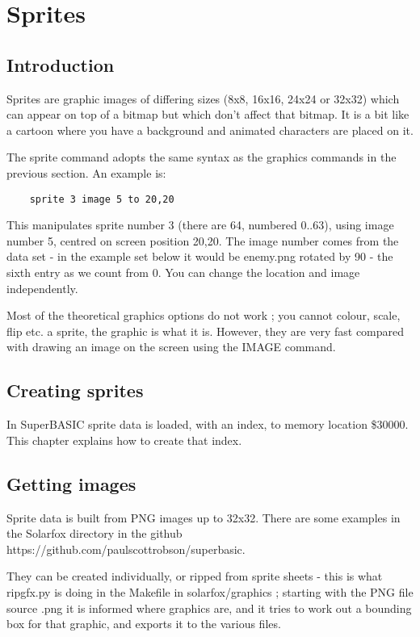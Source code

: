 \chapter{Sprites}

\section{Introduction}

Sprites are graphic images of differing sizes (8x8, 16x16, 24x24 or 32x32) which can appear on top of a bitmap but which don't affect that bitmap. It is a bit like a cartoon where you have a background and animated characters are placed on it.

The sprite command adopts the same syntax as the graphics commands in the previous section. An example is:

\begin{verbatim}
	sprite 3 image 5 to 20,20
\end{verbatim}

This manipulates sprite number 3 (there are 64, numbered 0..63), using image number 5, centred on screen position 20,20. The image number comes from the data set - in the example set below it would be enemy.png rotated by 90 - the sixth entry as we count from 0. You can change the location and image independently.

Most of the theoretical graphics options do not work ; you cannot colour, scale, flip etc. a sprite, the graphic is what it is. However, they are very fast compared with drawing an image on the screen using the IMAGE command.

\section {Creating sprites}

In SuperBASIC sprite data is loaded, with an index, to memory location \$30000. This chapter explains how to create that index.

\section{Getting images}

Sprite data is built from PNG images up to 32x32. There are some examples in the Solarfox directory in the github https://github.com/paulscottrobson/superbasic.

They can be created individually, or ripped from sprite sheets - this is what ripgfx.py is doing in the Makefile in solarfox/graphics ; starting with the PNG file source .png it is informed where graphics are, and it tries to work out a bounding box for that graphic, and exports it to the various files.

